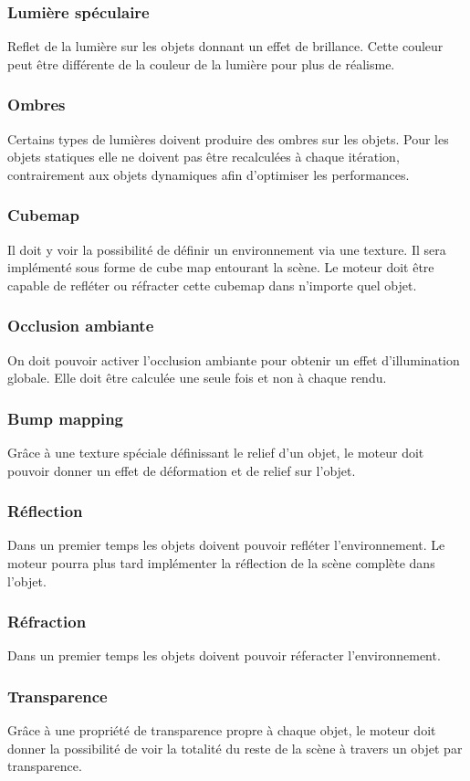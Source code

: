 \documentclass [a4 paper,11pt]{article}
\begin{document}
\subsubsection*{Lumière spéculaire}
Reflet de la lumière sur les objets donnant un effet de brillance. Cette couleur peut être différente de la couleur de la lumière pour plus de réalisme.
\subsubsection*{Ombres}
Certains types de lumières doivent produire des ombres sur les objets. 
Pour les objets statiques elle ne doivent pas être recalculées à chaque itération, contrairement aux objets dynamiques afin d'optimiser les performances.
\subsubsection*{Cubemap}
Il doit y voir la possibilité de définir un environnement via une texture. 
Il sera implémenté sous forme de cube map entourant la scène.
Le moteur doit être capable de refléter ou réfracter cette cubemap dans n'importe quel objet.
\subsubsection*{Occlusion ambiante}
On doit pouvoir activer l'occlusion ambiante pour obtenir un effet d'illumination globale.
Elle doit être calculée une seule fois et non à chaque rendu.
\subsubsection*{Bump mapping}
Grâce à une texture spéciale définissant le relief d'un objet, le moteur doit pouvoir donner un effet de déformation et de relief sur l'objet.
\subsubsection*{Réflection}
Dans un premier temps les objets doivent pouvoir refléter l'environnement.
Le moteur pourra plus tard implémenter la réflection de la scène complète dans l'objet.
\subsubsection*{Réfraction}
Dans un premier temps les objets doivent pouvoir réferacter l'environnement.
\subsubsection*{Transparence}
Grâce à une propriété de transparence propre à chaque objet, le moteur doit donner la possibilité de voir la totalité du reste de la scène à travers un objet par transparence.
\end{document}
